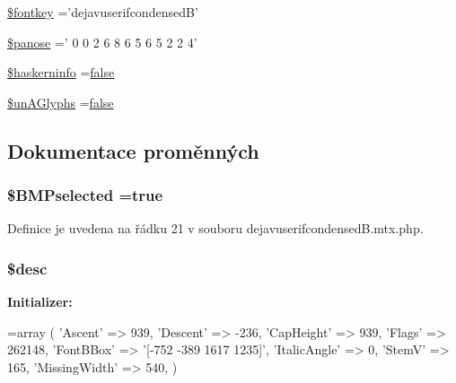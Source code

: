 \begin{DoxyCompactItemize}
\hyperlink{dejavuserifcondensed_b_8mtx_8php_a97b81cd1a67db21cdcae44cc49307a27}{\$fontkey} ='dejavuserifcondensed\-B'
\item 
\hyperlink{dejavuserifcondensed_b_8mtx_8php_adec3b939f59252683592e3ad31a0cd72}{\$panose} =' 0 0 2 6 8 6 5 6 5 2 2 4'
\item 
\hyperlink{dejavuserifcondensed_b_8mtx_8php_ad226b2764d22aeac7b4ec5d56b83128c}{\$haskerninfo} =\hyperlink{ttfontsuni_8php_afbaa04e5cc97693dc668b3c45d3dd740}{false}
\item 
\hyperlink{dejavuserifcondensed_b_8mtx_8php_a0306ade62464a165fe9fa56306f6dd17}{\$un\-A\-Glyphs} =\hyperlink{ttfontsuni_8php_afbaa04e5cc97693dc668b3c45d3dd740}{false}
\end{DoxyCompactItemize}


\subsection{Dokumentace proměnných}
\hypertarget{dejavuserifcondensed_b_8mtx_8php_a67fd6f661058b6635618e65431505e9b}{
\subsubsection[{\$\-B\-M\-Pselected}]{\setlength{\rightskip}{0pt plus 5cm}\$B\-M\-Pselected =true}}\label{dejavuserifcondensed_b_8mtx_8php_a67fd6f661058b6635618e65431505e9b}


Definice je uvedena na řádku 21 v souboru dejavuserifcondensed\-B.\-mtx.\-php.

\hypertarget{dejavuserifcondensed_b_8mtx_8php_a31059b9e4d0c5af34df20da32232ea9a}{
\subsubsection[{\$desc}]{\setlength{\rightskip}{0pt plus 5cm}\$desc}}\label{dejavuserifcondensed_b_8mtx_8php_a31059b9e4d0c5af34df20da32232ea9a}
{\bfseries Initializer\-:}
\begin{DoxyCode}
=array (
  \textcolor{stringliteral}{'Ascent'} => 939,
  \textcolor{stringliteral}{'Descent'} => -236,
  \textcolor{stringliteral}{'CapHeight'} => 939,
  \textcolor{stringliteral}{'Flags'} => 262148,
  \textcolor{stringliteral}{'FontBBox'} => \textcolor{stringliteral}{'[-752 -389 1617 1235]'},
  \textcolor{stringliteral}{'ItalicAngle'} => 0,
  \textcolor{stringliteral}{'StemV'} => 165,
  \textcolor{stringliteral}{'MissingWidth'} => 540,
)
\end{DoxyCode}


